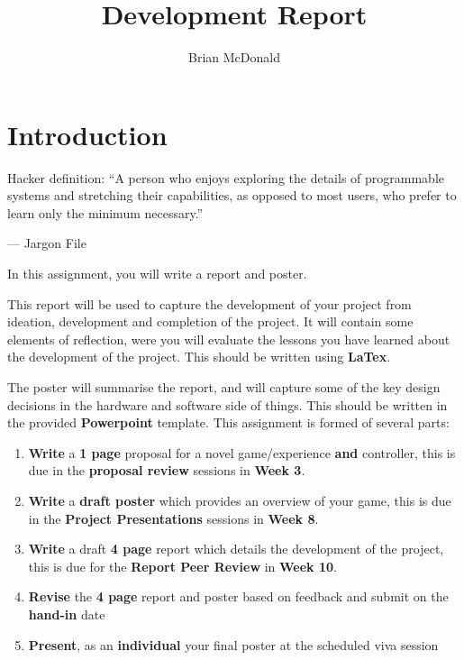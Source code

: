 \documentclass{../../fal_assignment}
\title{Development Report}
\author{Brian McDonald}
\begin{document}
\maketitle

\section*{Introduction}

\begin{marginquote}
Hacker definition: ``A person who enjoys exploring the details of programmable systems and stretching their capabilities, as opposed to most users, who prefer to learn only the minimum necessary.''

--- Jargon File

\end{marginquote}

In this assignment, you will write a report and poster. 

This report will be used to capture the development of your project from ideation, development and completion of the project. It will contain some elements of reflection, were you will evaluate the lessons you have learned about the development of the project. This should be written using \textbf{LaTex}.

The poster will summarise the report, and will capture some of the key design decisions in the hardware and software side of things. This should be written in the provided \textbf{Powerpoint} template.
This assignment is formed of several parts:

\begin{enumerate}[label=(\Alph*)]
    \item \textbf{Write} a \textbf{1 page} proposal for a novel game/experience \textbf{and} controller, this is due in the \textbf{proposal review} sessions in \textbf{Week 3}. 
	\item \textbf{Write} a \textbf{draft poster} which provides an overview of your game, this is due in the \textbf{Project Presentations} sessions in \textbf{Week 8}. 
	\item \textbf{Write} a draft \textbf{4 page} report which details the development of the project, this is due for the \textbf{Report Peer Review} in \textbf{Week 10}. 
	\item \textbf{Revise} the \textbf{4 page} report and poster based on feedback and submit on the  \textbf{hand-in} date
	\item \textbf{Present}, as an \textbf{individual} your final poster at the scheduled viva session
\end{enumerate}
\end{document}

